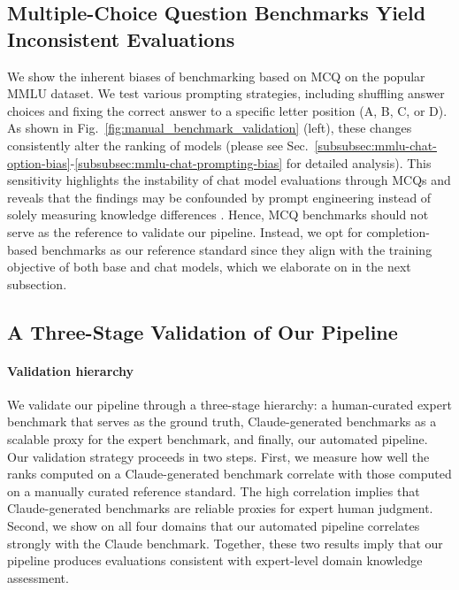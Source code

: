 \documentclass[10pt]{article}
\begin{document}
\subsection{Multiple-Choice Question Benchmarks Yield Inconsistent Evaluations} \vspace*{-.15cm}
\label{subsec:issues-with-qa}
We show the inherent biases of benchmarking based on MCQ on the popular MMLU dataset. We test various prompting strategies, including shuffling answer choices and fixing the correct answer to a specific letter position (A, B, C, or D).
As shown in Fig.~\ref{fig:manual_benchmark_validation} (left), these changes consistently alter the ranking of models (please see Sec.~\ref{subsubsec:mmlu-chat-option-bias}-\ref{subsubsec:mmlu-chat-prompting-bias} for detailed analysis).
This sensitivity highlights the instability of chat model evaluations through MCQs and reveals that the findings may be confounded by prompt engineering instead of solely measuring knowledge differences \citep{bai2022training, gupta2024changing, alzahrani2024benchmarks}. Hence, MCQ benchmarks should not serve as the reference to validate our pipeline. Instead, we opt for completion-based benchmarks as our reference standard since they align with the training objective of both base and chat models, which we elaborate on in the next subsection.


\subsection{A Three-Stage Validation of Our Pipeline} \vspace*{-.15cm}
\label{subsec:claude-benchmark}
\paragraph{Validation hierarchy}  We validate our pipeline through a three-stage hierarchy: a human-curated expert benchmark that serves as the ground truth, Claude-generated benchmarks as a scalable proxy for the expert benchmark, and finally, our automated pipeline. Our validation strategy proceeds in two steps. First, we measure how well the ranks computed on a Claude-generated benchmark correlate with those computed on a manually curated reference standard. The high correlation implies that Claude-generated benchmarks are reliable proxies for expert human judgment. Second, we show on all four domains that our automated pipeline correlates strongly with the Claude benchmark. Together, these two results imply that our pipeline produces evaluations consistent with expert-level domain knowledge assessment.
\end{document}
